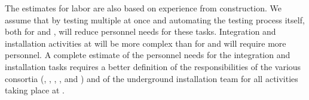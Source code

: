 The estimates for labor are also based on 
experience from  construction. We assume that by testing multiple 
at once and automating the testing process itself,
both for  and , will reduce personnel needs for these tasks. 
Integration and installation activities at 
will be more complex than for  and
will require more personnel. A complete estimate of the
personnel needs for the integration and installation tasks
requires a better definition of the responsibilities of
the various consortia (, , ,
, and ) and of the underground
installation team for all activities taking place
at .
